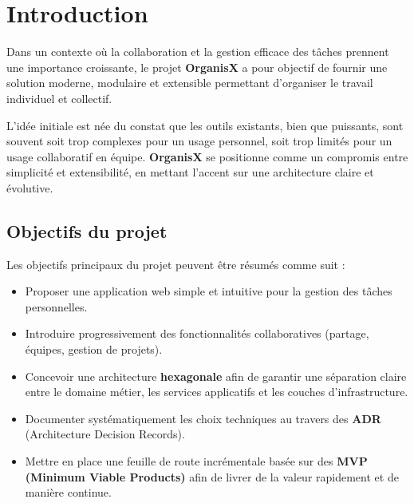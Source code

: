 \chapter{Introduction}

Dans un contexte où la collaboration et la gestion efficace des tâches prennent une importance croissante, le projet \textbf{OrganisX} a pour objectif de fournir une solution moderne, modulaire et extensible permettant d’organiser le travail individuel et collectif. 

L’idée initiale est née du constat que les outils existants, bien que puissants, sont souvent soit trop complexes pour un usage personnel, soit trop limités pour un usage collaboratif en équipe. \textbf{OrganisX} se positionne comme un compromis entre simplicité et extensibilité, en mettant l’accent sur une architecture claire et évolutive.

\section{Objectifs du projet}
Les objectifs principaux du projet peuvent être résumés comme suit :
\begin{itemize}
	\item Proposer une application web simple et intuitive pour la gestion des tâches personnelles.
	\item Introduire progressivement des fonctionnalités collaboratives (partage, équipes, gestion de projets).
	\item Concevoir une architecture \textbf{hexagonale} afin de garantir une séparation claire entre le domaine métier, les services applicatifs et les couches d’infrastructure.
	\item Documenter systématiquement les choix techniques au travers des \textbf{ADR} (Architecture Decision Records).
	\item Mettre en place une feuille de route incrémentale basée sur des \textbf{MVP (Minimum Viable Products)} afin de livrer de la valeur rapidement et de manière continue.
\end{itemize}

